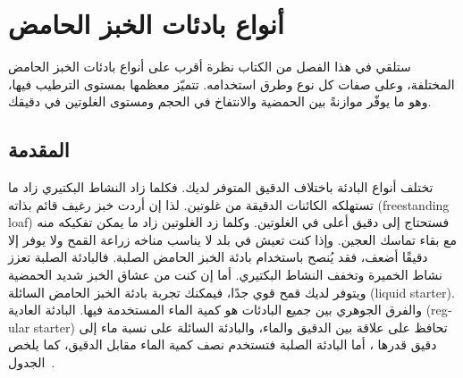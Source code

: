 %
%
%

\chapter{أنواع بادئات الخبز الحامض}\label{ch:starter-types}

\begin{quoting}
ستلقي في هذا الفصل من الكتاب نظرة أقرب على أنواع بادئات الخبز الحامض المختلفة، وعلى صفات كل نوع وطرق استخدامه. تتميّز معظمها بمستوى الترطيب فيها، وهو ما يوفّر موازنةً بين الحمضية والانتفاخ في الحجم ومستوى الغلوتين في دقيقك.
\end{quoting}

\section{المقدمة}\label{sec:starter-types-intro}

تختلف أنواع البادئة باختلاف الدقيق المتوفر لديك. فكلما زاد النشاط البكتيري زاد ما تستهلكه الكائنات الدقيقة من غلوتين. لذا إن أردت خبز رغيف قائم بذاته \textenglish{(freestanding loaf)} فستحتاج إلى دقيق أعلى في الغلوتين. وكلما زد الغلوتين زاد ما يمكن تفكيكه منه مع بقاء تماسك العجين. وإذا كنت تعيش في بلد لا يناسب مناخه زراعة القمح ولا يوفر إلا دقيقًا أضعف، فقد يُنصح باستخدام بادئة الخبز الحامض الصلبة. فالبادئة الصلبة تعزز نشاط الخميرة وتخفف النشاط البكتيري. أما إن كنت من عشاق الخبز شديد الحمضية ويتوفر لديك قمح قوي جدًا، فيمكنك تجربة بادئة الخبز الحامض السائلة \textenglish{(liquid starter)}. والفرق الجوهري بين جميع البادئات هو كمية الماء المستخدمة فيها. البادئة العادية \textenglish{(regular starter)} تحافظ على علاقة  بين الدقيق والماء، والبادئة السائلة على نسبة ماء إلى دقيق قدرها ، أما البادئة الصلبة فتستخدم نصف كمية الماء مقابل الدقيق، كما يلخص الجدول~\LR{\ref{tab:starter-types-comparison}}.

